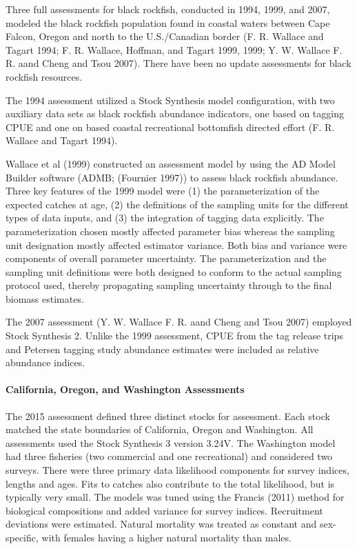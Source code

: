 \documentclass[11pt,
  english,
  letterpaper,
]{article}
\begin{document}
Three full assessments for black rockfish, conducted in 1994, 1999, and 2007, modeled the black rockfish population found in coastal waters between Cape Falcon, Oregon and north to the U.S./Canadian border (F. R. Wallace and Tagart 1994; F. R. Wallace, Hoffman, and Tagart 1999, 1999; Y. W. Wallace F. R. aand Cheng and Tsou 2007). There have been no update assessments for black rockfish resources.

The 1994 assessment utilized a Stock Synthesis model configuration, with two auxiliary data sets as black rockfish abundance indicators, one based on tagging CPUE and one on based coastal recreational bottomfish directed effort (F. R. Wallace and Tagart 1994).

Wallace et al (1999) constructed an assessment model by using the AD Model Builder software (ADMB; (Fournier 1997)) to assess black rockfish abundance. Three key features of the 1999 model were (1) the parameterization of the expected catches at age, (2) the definitions of the sampling units for the different types of data inputs, and (3) the integration of tagging data explicitly. The parameterization chosen mostly affected parameter bias whereas the sampling unit designation mostly affected estimator variance. Both bias and variance were components of overall parameter uncertainty. The parameterization and the sampling unit definitions were both designed to conform to the actual sampling protocol used, thereby propagating sampling uncertainty through to the final biomass estimates.

The 2007 assessment (Y. W. Wallace F. R. aand Cheng and Tsou 2007) employed Stock Synthesis 2. Unlike the 1999 assessment, CPUE from the tag release trips and Petersen tagging study abundance estimates were included as relative abundance indices.

\hypertarget{california-oregon-and-washington-assessments}{%
\paragraph{California, Oregon, and Washington Assessments}\label{california-oregon-and-washington-assessments}}

The 2015 assessment defined three distinct stocks for assessment. Each stock matched the state boundaries of California, Oregon and Washington. All assessments used the Stock Synthesis 3 version 3.24V. The Washington model had three fisheries (two commercial and one recreational) and considered two surveys. There were three primary data likelihood components for survey indices, lengths and ages. Fits to catches also contribute to the total likelihood, but is typically very small. The models was tuned using the Francis (2011) method for biological compositions and added variance for survey indices. Recruitment deviations were estimated. Natural mortality was treated as constant and sex-specific, with females having a higher natural mortality than males.
\end{document}
